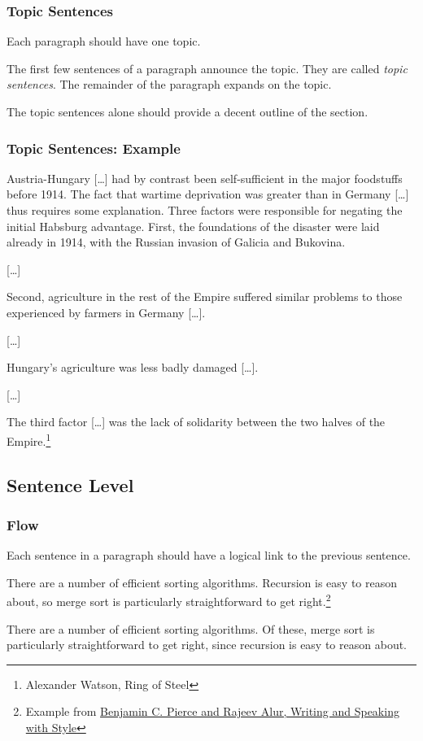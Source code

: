 \begin{frame}
  \frametitle{Topic Sentences}

  Each paragraph should have one topic.

  \medskip

  The first few sentences of a paragraph announce the topic.
  They are called \emph{topic sentences}.
  The remainder of the paragraph expands on the topic.

  \medskip

  The topic sentences alone should provide a decent outline of the section.
\end{frame}

\begin{frame}
  \frametitle{Topic Sentences: Example}

  \small
  Austria-Hungary [\dots] had by contrast been self-sufficient in the major foodstuffs before 1914.
  The fact that wartime deprivation was greater than in Germany [\dots] thus requires some explanation.
  Three factors were responsible for negating the initial Habsburg advantage.
  First, the foundations of the disaster were laid already in 1914, with the Russian invasion of Galicia and Bukovina.

  [\dots]

  Second, agriculture in the rest of the Empire suffered similar problems to those experienced by farmers in Germany [\dots].

  [\dots]

  Hungary's agriculture was less badly damaged [\dots].

  [\dots]

  The third factor [\dots] was the lack of solidarity between the two halves of the Empire.\footnote{Alexander Watson, Ring of Steel}
\end{frame}

\subsection{Sentence Level}

\begin{frame}
  \frametitle{Flow}

  Each sentence in a paragraph should have a logical link to the previous sentence.

  \medskip
  \pause


  {
    \small
    There are a number of efficient sorting algorithms.
    Recursion is easy to reason about, so merge sort is particularly straightforward to get right.\footnote{Example from \href{https://docs.google.com/document/d/1_vBXbugoLjO171w3wovs3ugmRQI-O6EcSVFDBF7eUzE/edit}{Benjamin C. Pierce and Rajeev Alur, Writing and Speaking with Style}}
  }

  \medskip
  \pause


  {
    \small
    There are a number of efficient sorting algorithms.
    Of these, merge sort is particularly straightforward to get right, since recursion is easy to reason about.
  }
\end{frame}

